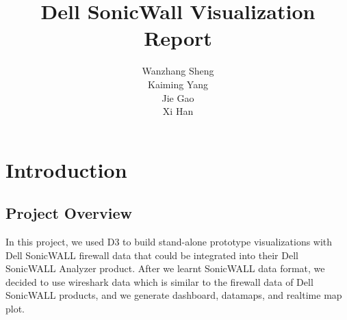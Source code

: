 \documentclass[paper=a4, fontsize=11pt]{report} %
\title{Dell SonicWall Visualization Report}
\author{
Wanzhang Sheng\\
Kaiming Yang\\
Jie Gao\\
Xi Han
}
\begin{document}
\maketitle


\chapter{Introduction} %
\label{cha:introduction}

\section{Project Overview} %
\label{sec:project_overview}
In this project, we used D3 to build stand-alone prototype visualizations with Dell SonicWALL firewall data that could be integrated into their Dell SonicWALL Analyzer product. After we learnt SonicWALL data format, we decided to use wireshark data which is similar to the firewall data of Dell SonicWALL products, and we generate dashboard, datamaps, and realtime map plot.
\end{document}
